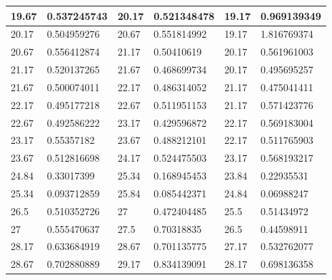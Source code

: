 \documentclass[11pt, letterpaper]{article}
\begin{document}
\begin{appendices}
\begin{table}[!ht]
\begin{tabular}{|l|l|l|l|l|l|}
        19.67 & 0.537245743 & 20.17 & 0.521348478 & 19.17 & 0.969139349 \\ \hline
        20.17 & 0.504959276 & 20.67 & 0.551814992 & 19.17 & 1.816769374 \\ \hline
        20.67 & 0.556412874 & 21.17 & 0.50410619 & 20.17 & 0.561961003 \\ \hline
        21.17 & 0.520137265 & 21.67 & 0.468699734 & 20.17 & 0.495695257 \\ \hline
        21.67 & 0.500074011 & 22.17 & 0.486314052 & 21.17 & 0.475041411 \\ \hline
        22.17 & 0.495177218 & 22.67 & 0.511951153 & 21.17 & 0.571423776 \\ \hline
        22.67 & 0.492586222 & 23.17 & 0.429596872 & 22.17 & 0.569183004 \\ \hline
        23.17 & 0.55357182 & 23.67 & 0.488212101 & 22.17 & 0.511765903 \\ \hline
        23.67 & 0.512816698 & 24.17 & 0.524475503 & 23.17 & 0.568193217 \\ \hline
        24.84 & 0.33017399 & 25.34 & 0.168945453 & 23.84 & 0.22935531 \\ \hline
        25.34 & 0.093712859 & 25.84 & 0.085442371 & 24.84 & 0.06988247 \\ \hline
        26.5 & 0.510352726 & 27 & 0.472404485 & 25.5 & 0.51434972 \\ \hline
        27 & 0.555470637 & 27.5 & 0.70318835 & 26.5 & 0.44598911 \\ \hline
        28.17 & 0.633684919 & 28.67 & 0.701135775 & 27.17 & 0.532762077 \\ \hline
        28.67 & 0.702880889 & 29.17 & 0.834139091 & 28.17 & 0.698136358 \\ \hline
    \end{tabular}
\end{table}


\end{appendices}
\end{document}
